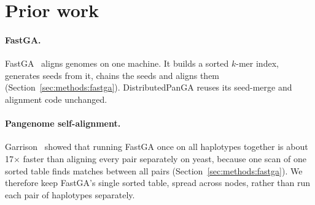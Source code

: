 \section{Prior work}\label{sec:prior}

\paragraph{FastGA.} FastGA~\cite{fastga} aligns genomes on one machine. It
builds a sorted $k$-mer index, generates seeds from it, chains the seeds
and aligns them (Section~\ref{sec:methods:fastga}). DistributedPanGA reuses
its seed-merge and alignment code unchanged.

\paragraph{Pangenome self-alignment.} Garrison~\cite{garrison} showed that
running FastGA once on all haplotypes together is about 17$\times$ faster
than aligning every pair separately on yeast, because one scan of one
sorted table finds matches between all pairs (Section~\ref{sec:methods:fastga}).
We therefore keep FastGA's single sorted table,
spread across nodes, rather than run each pair of haplotypes separately.
